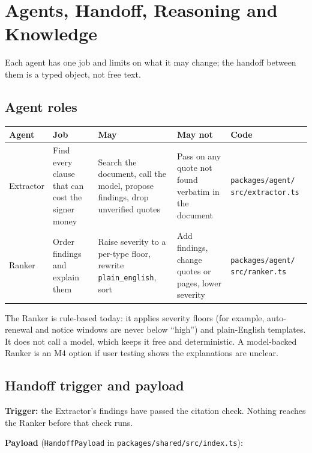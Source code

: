 \documentclass[11pt,letterpaper]{article}
\newcommand{\code}[1]{\texttt{#1}}
\begin{document}
\section{Agents, Handoff, Reasoning and Knowledge}\label{sec:agents}

Each agent has one job and limits on what it may change; the handoff between them is a typed object, not free text.

\subsection{Agent roles}

\begin{table}[htbp]
\centering
\small
\begin{tabularx}{\textwidth}{@{}p{1.6cm}LLLp{2.6cm}@{}}
\toprule
\textbf{Agent} & \textbf{Job} & \textbf{May} & \textbf{May not} & \textbf{Code} \\
\midrule
Extractor & Find every clause that can cost the signer money & Search the document, call the model, propose findings, drop unverified quotes & Pass on any quote not found verbatim in the document & \code{packages/agent/ src/extractor.ts} \\
Ranker & Order findings and explain them & Raise severity to a per-type floor, rewrite \code{plain\_english}, sort & Add findings, change quotes or pages, lower severity & \code{packages/agent/ src/ranker.ts} \\
\bottomrule
\end{tabularx}
\end{table}

The Ranker is rule-based today: it applies severity floors (for example, auto-renewal and notice windows are never below ``high'') and plain-English templates. It does not call a model, which keeps it free and deterministic. A model-backed Ranker is an M4 option if user testing shows the explanations are unclear.

\subsection{Handoff trigger and payload}

\textbf{Trigger:} the Extractor's findings have passed the citation check. Nothing reaches the Ranker before that check runs.

\textbf{Payload} (\code{HandoffPayload} in \code{packages/shared/src/index.ts}):
\end{document}
